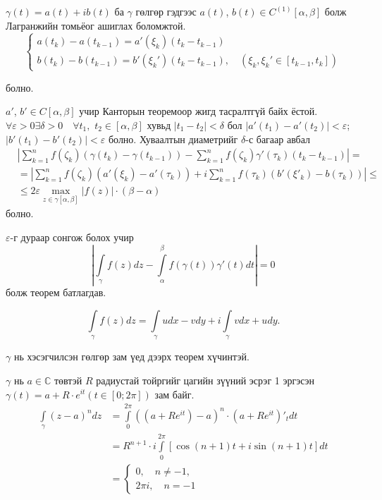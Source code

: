 \begin{prf}
$\gamma (t)=a(t)+ib(t)$ ба $\gamma$ гөлгөр гэдгээс $a(t)$, $b(t)\in C^{(1)}[\alpha,\beta]$ болж Лагранжийн томьёог ашиглах боломжтой.
$$
\begin{cases}
a(t_k)-a(t_{k-1})=a'(\xi_k)(t_k-t_{k-1}) \\
b(t_k)-b(t_{k-1})=b'(\xi_k')(t_k-t_{k-1}), \quad (\xi_k,\xi_k'\in[t_{k-1},t_k]) 
\end{cases}
$$ 

болно.

$a'$, $b'\in C[\alpha,\beta]$ учир Канторын теоремоор жигд тасралтгүй байх ёстой. $\forall \varepsilon >0 \exists \delta >0 \quad \forall t_1,$ $t_2\in [\alpha, \beta]$ хувьд $|t_1-t_2|<\delta$ бол $|a'(t_1)-a'(t_2)|<\varepsilon$; $|b'(t_1)-b'(t_2)|<\varepsilon$ болно. Хуваалтын диаметрийг $\delta$-с багаар авбал 
\begin{align*}
    &\left|\sum\limits_{k=1}^n f(\zeta_k)(\gamma(t_k)-\gamma(t_{k-1}))-\sum\limits_{k=1}^nf(\zeta_k)\gamma'(\tau_k)(t_k-t_{k-1})\right|=\\
    &=\left| \sum\limits_{k=1}^n f(\zeta_k)(a'(\xi_k)-a'(\tau_{k}))+i\sum\limits_{k=1}^nf(\tau_k)(b'(\xi'_k)-b(\tau_{k}))\right|\leq \\
    &\leq 2\varepsilon \max\limits_{z\in \gamma [\alpha,\beta]}|f(z)|\cdot (\beta-\alpha)
\end{align*}
болно.

$\varepsilon$-г дураар сонгож болох учир
$$\left|\int\limits_\gamma f(z)dz-\int\limits_\alpha^\beta f(\gamma(t))\gamma '(t)dt\right|=0$$
болж теорем батлагдав. 
\end{prf} 
\begin{cor}
$$\int\limits_\gamma f(z)dz=\int\limits_\gamma udx-vdy+i\int\limits_\gamma vdx+udy.$$
\end{cor}
\begin{cor}
$\gamma$ нь хэсэгчилсэн гөлгөр зам үед дээрх теорем хүчинтэй.
\end{cor}
\begin{exm} \label{Example z^n int}
$\gamma$ нь $a\in\mathbb{C}$ төвтэй $R$ радиустай тойргийг цагийн зүүний эсрэг 1 эргэсэн $\gamma(t)=a+R\cdot e^{it}(t\in[0;2\pi])$ зам байг.
\begin{align*}
    \int\limits_\gamma (z-a)^n dz&=\int\limits_{0}^{2\pi} ((a+Re^{it})-a)^n\cdot(a+Re^{it})'_tdt \\
    &=R^{n+1}\cdot i\int\limits_0^{2\pi} [\cos (n+1)t+i\sin (n+1)t]dt \\
    &=
    \begin{cases}
    0, \quad n\neq -1, \\
    2\pi i, \quad n=-1
    \end{cases}
\end{align*}
\end{exm}
